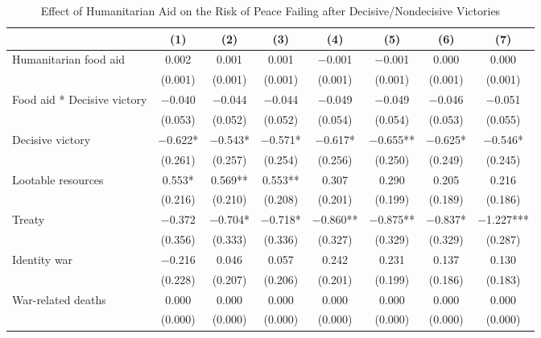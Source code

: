 \begin{table}
\centering\centering
\caption{Effect of Humanitarian Aid on the Risk of Peace Failing after Decisive/Nondecisive Victories \label{a\_peace\_table2}}
\centering
\fontsize{8}{10}\selectfont
\begin{threeparttable}
\begin{tabular}[t]{lccccccc}
\toprule
  & (1) & (2) & (3) & (4) & (5) & (6) & (7)\\
\midrule
Humanitarian food aid & \num{0.002} & \num{0.001} & \num{0.001} & \num{-0.001} & \num{-0.001} & \num{0.000} & \num{0.000}\\
 & (\num{0.001}) & (\num{0.001}) & (\num{0.001}) & (\num{0.001}) & (\num{0.001}) & (\num{0.001}) & (\num{0.001})\\
Food aid * Decisive victory & \num{-0.040} & \num{-0.044} & \num{-0.044} & \num{-0.049} & \num{-0.049} & \num{-0.046} & \num{-0.051}\\
 & (\num{0.053}) & (\num{0.052}) & (\num{0.052}) & (\num{0.054}) & (\num{0.054}) & (\num{0.053}) & (\num{0.055})\\
Decisive victory & \num{-0.622}* & \num{-0.543}* & \num{-0.571}* & \num{-0.617}* & \num{-0.655}** & \num{-0.625}* & \num{-0.546}*\\
 & (\num{0.261}) & (\num{0.257}) & (\num{0.254}) & (\num{0.256}) & (\num{0.250}) & (\num{0.249}) & (\num{0.245})\\
Lootable resources & \num{0.553}* & \num{0.569}** & \num{0.553}** & \num{0.307} & \num{0.290} & \num{0.205} & \num{0.216}\\
 & (\num{0.216}) & (\num{0.210}) & (\num{0.208}) & (\num{0.201}) & (\num{0.199}) & (\num{0.189}) & (\num{0.186})\\
Treaty & \num{-0.372} & \num{-0.704}* & \num{-0.718}* & \num{-0.860}** & \num{-0.875}** & \num{-0.837}* & \num{-1.227}***\\
 & (\num{0.356}) & (\num{0.333}) & (\num{0.336}) & (\num{0.327}) & (\num{0.329}) & (\num{0.329}) & (\num{0.287})\\
Identity war & \num{-0.216} & \num{0.046} & \num{0.057} & \num{0.242} & \num{0.231} & \num{0.137} & \num{0.130}\\
 & (\num{0.228}) & (\num{0.207}) & (\num{0.206}) & (\num{0.201}) & (\num{0.199}) & (\num{0.186}) & (\num{0.183})\\
War-related deaths & \num{0.000} & \num{0.000} & \num{0.000} & \num{0.000} & \num{0.000} & \num{0.000} & \num{0.000}\\
 & (\num{0.000}) & (\num{0.000}) & (\num{0.000}) & (\num{0.000}) & (\num{0.000}) & (\num{0.000}) & (\num{0.000})\\

\end{tabular}
\end{threeparttable}
\end{table}

